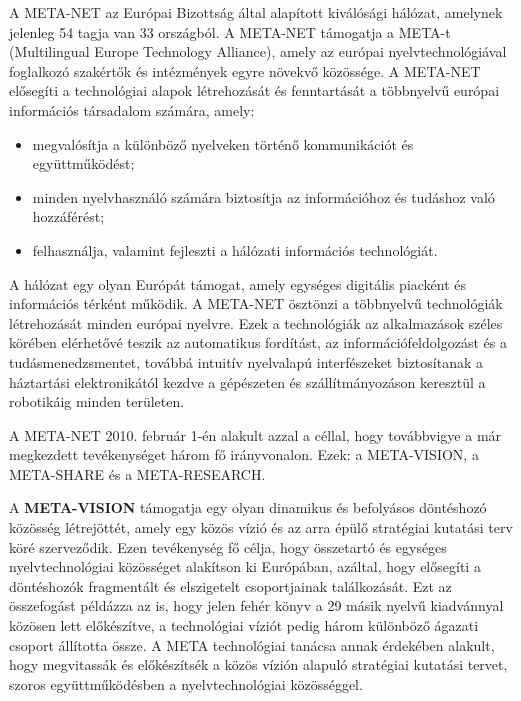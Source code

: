 \begin{multicols}{2}

A META-NET az Európai Bizottság által alapított kiválósági hálózat, amelynek jelenleg 54 tagja van 33 országból\cite{rehm2011}. A META-NET támogatja a META-t (Multilingual Europe Technology Alliance), amely az európai nyelvtechnológiával foglalkozó szakértők és intézmények egyre növekvő közössége. A META-NET elősegíti a technológiai alapok létrehozását és fenn\-tar\-tá\-sát a többnyelvű európai információs társadalom számára, amely:

\begin{itemize}
\item megvalósítja a különböző nyelveken történő kommunikációt és együtt\-mű\-kö\-dést;
\item minden nyelvhasználó számára biztosítja az információhoz és tudáshoz való hozzáférést;
\item felhasználja, valamint fejleszti a hálózati információs technológiát.
\end{itemize}

A hálózat egy olyan Európát támogat, amely egységes digitális piacként és információs térként működik. A META-NET ösztönzi a többnyelvű technológiák létrehozását minden európai nyelvre. Ezek a technológiák az alkalmazások széles körében elérhetővé teszik az automatikus fordítást, az információfeldolgozást és a tudásmenedzsmentet, továbbá intuitív nyelvalapú interfészeket biztosítanak a háztartási elektronikától kezdve a gépészeten és szállítmányozáson keresztül a robotikáig minden területen. 

A META-NET 2010. február 1-én alakult azzal a céllal, hogy továbbvigye a már megkezdett tevékenységet három fő irányvonalon. Ezek: a META-VISION, a META-SHARE és a META-RESEARCH. 

A \textbf{META-VISION} támogatja egy olyan dinamikus és befolyásos döntéshozó kö\-zös\-ség létrejöttét, amely egy közös vízió és az arra épülő stratégiai kutatási terv köré szerveződik. Ezen tevékenység fő célja, hogy összetartó és egységes nyelvtechnológiai közösséget alakítson ki Európában, azáltal, hogy elősegíti a döntéshozók fragmentált és elszigetelt csoportjainak ta\-lál\-ko\-zá\-sát. Ezt az összefogást példázza az is, hogy jelen fehér könyv a 29 másik nyelvű kiadvánnyal közösen lett előkészítve, a technológiai víziót pedig három különböző ágazati csoport állította össze. A META technológiai tanácsa annak érdekében alakult, hogy megvitassák és előkészítsék a közös vízión alapuló stratégiai kutatási tervet, szoros együttműködésben a nyelvtechnológiai közösséggel. 


\end{multicols}
